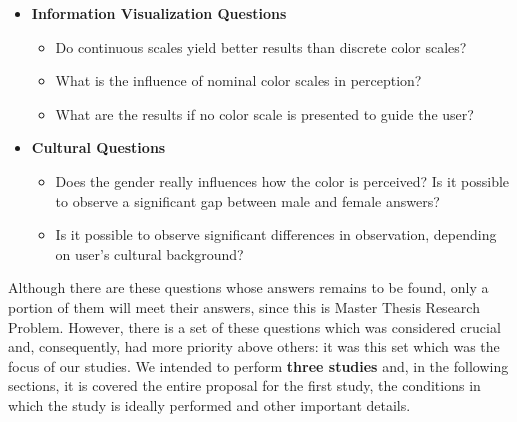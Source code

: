 \begin{itemize}
    \item \textbf{Information Visualization Questions}
    \begin{itemize}
    	\setlength\itemsep{0.1em}
		\item Do continuous scales yield better results than discrete color scales?
        \item What is the influence of nominal color scales in perception?
        \item What are the results if no color scale is presented to guide the user?
	\end{itemize}
    \item \textbf{Cultural Questions}
    \begin{itemize}
    	\setlength\itemsep{0.1em}
		\item Does the gender really influences how the color is perceived? Is it possible to observe a significant gap between male and female answers?
\item Is it possible to observe significant differences in observation, depending on user's cultural background?
	\end{itemize}
\end{itemize} \par
%
Although there are these questions whose answers remains to be found, only a portion of them will meet their answers, since this is Master Thesis Research Problem. However, there is a set of these questions which was considered crucial and, consequently, had more priority above others: it was this set which was the focus of our studies. We intended to perform \textbf{three studies} and, in the following sections, it is covered the entire proposal for the first study, the conditions in which the study is ideally performed and other important details.
%
